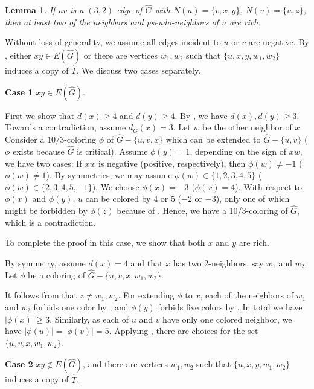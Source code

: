 \documentclass[11pt,a4paper]{article}
\makeatletter
\renewenvironment{proof}[1][\proofname]{\par
	\pushQED{\qed}%
	\normalfont \topsep6\p@\@plus6\p@\relax
	\trivlist
	\item[\hskip\labelsep
	\bfseries
	#1\@addpunct{.}]\ignorespaces
}{%
	\popQED\endtrivlist\@endpefalse
}
\newtheorem{lemma}[theorem]{Lemma}
\theoremstyle{definition}
\makeatother
\begin{document}
\begin{lemma}\label{lem:32-edge}
	If $uv$ is a $(3,2)$-edge of $\widehat{G}$ with $N(u)=\{v,x,y\}$, $N(v)=\{u,z\}$,  then at least two of the neighbors and pseudo-neighbors of $u$  are rich. 
\end{lemma}

\begin{proof}
	Without loss of generality,  we assume all edges incident to  $u$ or $v$ are negative. By , either $xy\in E(\widehat{G})$ or there are vertices $w_1,w_2$ such that $\{u, x, y, w_1, w_2\}$ induces a copy of $\widehat{T}$. We discuss two cases separately. 
	\setcounter{claim}{0}
	
	\noindent
	\textbf{Case 1} $xy\in E(\widehat{G})$.
	
	First we show that $d(x)\ge 4$ and $d(y)\ge 4$. By , we have $d(x), d(y)\geq 3$. Towards a contradiction, assume $d_G(x)=3$. Let $w$ be the other neighbor of $x$. Consider a $10/3$-coloring $\phi$ of $\widehat{G}-\{u,v,x\}$ which can be extended to $\widehat{G}-\{u,v\}$ ($\phi$ exists because $\widehat{G}$ is critical). Assume $\phi(y)=1$, depending on the sign of $xw$, we have two cases: If $xw$ is negative (positive, respectively), then $\phi(w)\neq -1$ ($\phi(w)\neq 1$). By symmetries, we may assume $\phi(w)\in \{1,2,3,4,5\}$ ($\phi(w)\in \{2,3,4,5,-1\}$). We choose $\phi(x)=-3$ ($\phi(x)=4$). With respect to $\phi(x)$ and $\phi(y)$, $u$ can be colored by $4$ or $5$ ($-2$ or $-3$), only one of which might be forbidden by $\phi(z)$ because of . Hence, we have a 10/3-coloring of $\widehat{G}$, which is a contradiction.    
	
	To complete the proof in this case, we show that both $x$ and $y$ are rich.
	
	By symmetry, assume $d(x)=4$ and that $x$ has two 2-neighbors, say $w_1$ and $w_2$. Let $\phi$  be a coloring of $\widehat{G}-\{u,v,x, w_1, w_2\}$. 
	
	It follows from  that $z\neq w_1, w_2$. For extending $\phi$ to $x$, each of the neighbors of $w_1$ and $w_2$ forbids one color by , and $\phi(y)$ forbids five colors by . In total we have $|\phi(x)|\ge 3$.  Similarly, as each of $u$ and $v$ have only one colored neighbor, we have $|\phi(u)|=|\phi(v)|=5$. Applying , there are choices for the set $\{u,v,x, w_1, w_2\}$.
	
	\bigskip
	\noindent
	\textbf{Case 2} $xy\notin E(\widehat{G})$, and there are vertices $w_1,w_2$ such that $\{u, x, y, w_1, w_2\}$ induces a copy of $\widehat{T}$.
	

\end{proof}
\end{document}
